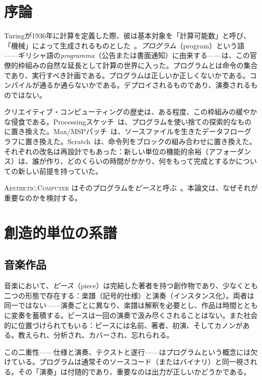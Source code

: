 \documentclass[10pt,letterpaper,twocolumn]{article}
\newcommand{\ac}{\textsc{Aesthetic.Computer}}
\begin{document}
\section{序論}

Turingが1936年に計算を定義した際、彼は基本対象を「計算可能数」と呼び、「機械」によって生成されるものとした~\citep{turing1936computable}。\emph{プログラム}（program）という語——ギリシャ語の\emph{programma}（公告または書面通知）に由来する——は、この官僚的枠組みの自然な延長として計算の世界に入った。プログラムとは命令の集合であり、実行すべき計画である。プログラムは正しいか正しくないかである。コンパイルが通るか通らないかである。デプロイされるものであり、演奏されるものではない。

クリエイティブ・コンピューティングの歴史は、ある程度、この枠組みの緩やかな侵食である。Processingスケッチ~\citep{reas2007processing}は、プログラムを使い捨ての探索的なものに置き換えた。Max/MSPパッチ~\citep{puckette1988patcher}は、ソースファイルを生きたデータフローグラフに置き換えた。Scratch~\citep{resnick2009scratch}は、命令列をブロックの組み合わせに置き換えた。それぞれの改名は再設計でもあった：新しい単位の機能的余裕（アフォーダンス）は、誰が作り、どのくらいの時間がかかり、何をもって完成とするかについての新しい前提を持っていた。

\ac{} はそのプログラムを\emph{ピース}と呼ぶ~\citep{scudder2026ac}。本論文は、なぜそれが重要なのかを検討する。

\section{創造的単位の系譜}

\subsection{音楽作品}

音楽において、\emph{ピース}（piece）は完結した著者を持つ創作物であり、少なくとも二つの形態で存在する：楽譜（記号的仕様）と演奏（インスタンス化）。両者は同一ではない——演奏ごとに異なり、楽譜は解釈を必要とし、作品は時間とともに変奏を蓄積する。ピースは一回の演奏で汲み尽くされることはない。また社会的に位置づけられてもいる：ピースには名前、著者、初演、そしてカノンがある。教えられ、分析され、カバーされ、忘れられる。

この二重性——仕様と演奏、テクストと遂行——はプログラムという概念には欠けている。プログラムは通常そのソースコード（またはバイナリ）と同一視される。その「演奏」は付随的であり、重要なのは出力が正しいかどうかである。
\end{document}
